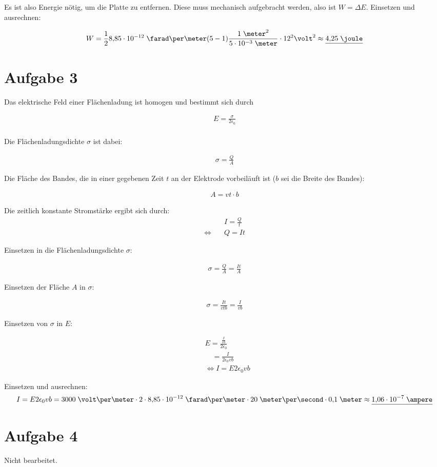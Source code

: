 \documentclass[a4paper,german,12pt,smallheadings]{scrartcl}
\begin{document}
Es ist also Energie nötig, um die Platte zu entfernen. Diese muss mechanisch
aufgebracht werden, also ist $W = \Delta E$. Einsetzen und ausrechnen:

\begin{align*}
  W = \frac{1}{2} 8{,}85 \cdot 10^{-12} \;\farad\per\meter (5-1) \frac{1\;\meter^2}{5\cdot 10^{-3}\;\meter} \cdot 12^2 \volt^2 \approx \underline{4{,}25\;\joule}
\end{align*}

\section*{Aufgabe 3}

Das elektrische Feld einer Flächenladung ist homogen und bestimmt sich durch

\begin{align*}
  E = \frac{\sigma}{2 \epsilon_0} \\
\end{align*}

Die Flächenladungsdichte $\sigma$ ist dabei:

\begin{align*}
  \sigma = \frac{Q}{A}
\end{align*}

Die Fläche des Bandes, die in einer gegebenen Zeit $t$ an der Elektrode
vorbeiläuft ist ($b$ sei die Breite des Bandes):

\begin{align*}
  A = vt \cdot b
\end{align*}

Die zeitlich konstante Stromstärke ergibt sich durch:
\begin{align*}
  &I = \frac{Q}{t} \\
  \Leftrightarrow \quad &Q = It
\end{align*}

Einsetzen in die Flächenladungsdichte $\sigma$:

\begin{align*}
  \sigma = \frac{Q}{A} = \frac{It}{A}
\end{align*}

Einsetzen der Fläche $A$ in $\sigma$:

\begin{align*}
  \sigma = \frac{It}{vtb} = \frac{I}{vb} 
\end{align*}

Einsetzen von $\sigma$ in $E$:

\begin{align*}
  &E = \frac{\frac{I}{vb}}{2 \epsilon_0} \\
  &\quad = \frac{I}{2 \epsilon_0 vb} \\
  &\Leftrightarrow I = E 2\epsilon_0 vb
\end{align*}

Einsetzen und ausrechnen:
\begin{align*}
  I = E 2 \epsilon_0 v b = 3000\;\volt\per\meter \cdot 2 \cdot 8{,}85\cdot10^{-12}\;\farad\per\meter \cdot 20\;\meter\per\second \cdot 0{,}1\;\meter \approx \underline{1{,}06 \cdot 10^{-7}\;\ampere}
\end{align*}

\section*{Aufgabe 4}

Nicht bearbeitet.
\end{document}
